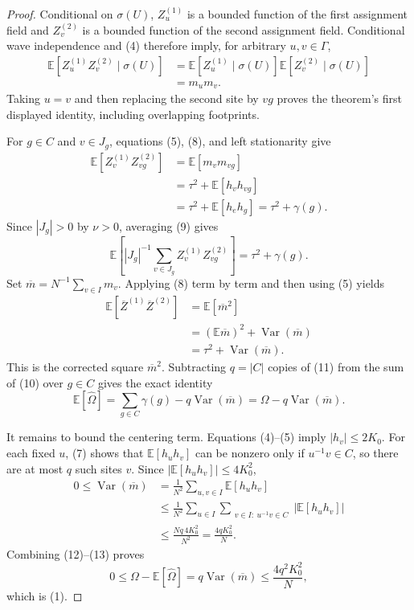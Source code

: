 \documentclass{article}
\begin{document}
\begin{proof}
Conditional on \(\sigma(U)\), \(Z_u^{(1)}\) is a bounded function of the first assignment field and \(Z_v^{(2)}\) is a bounded function of the second assignment field.  Conditional wave independence and (4) therefore imply, for arbitrary \(u,v\in\Gamma\),
\[
 \begin{aligned}
 \mathbb E[Z_u^{(1)}Z_v^{(2)}\mid\sigma(U)]
 &=\mathbb E[Z_u^{(1)}\mid\sigma(U)]
   \mathbb E[Z_v^{(2)}\mid\sigma(U)]\\
 &=m_um_v.
 \end{aligned} \tag{8}
\]
Taking \(u=v\) and then replacing the second site by \(vg\) proves the theorem's first displayed identity, including overlapping footprints.

For \(g\in C\) and \(v\in J_g\), equations (5), (8), and left stationarity give
\[
 \begin{aligned}
 \mathbb E[Z_v^{(1)}Z_{vg}^{(2)}]
 &=\mathbb E[m_vm_{vg}]\\
 &=\tau^2+\mathbb E[h_vh_{vg}]\\
 &=\tau^2+\mathbb E[h_eh_g]
 =\tau^2+\gamma(g).
 \end{aligned} \tag{9}
\]
Since \(|J_g|>0\) by \(\nu>0\), averaging (9) gives
\[
 \mathbb E\!\left[
 |J_g|^{-1}\sum_{v\in J_g}Z_v^{(1)}Z_{vg}^{(2)}
 \right]=\tau^2+\gamma(g). \tag{10}
\]
Set \(\overline m=N^{-1}\sum_{v\in I}m_v\).  Applying (8) term by term and then using (5) yields
\[
 \begin{aligned}
 \mathbb E[\overline Z^{(1)}\overline Z^{(2)}]
 &=\mathbb E[\overline m^2]\\
 &=(\mathbb E\overline m)^2+\operatorname{Var}(\overline m)\\
 &=\tau^2+\operatorname{Var}(\overline m).
 \end{aligned} \tag{11}
\]
This is the corrected square \(\overline m^2\).  Subtracting \(q=|C|\) copies of (11) from the sum of (10) over \(g\in C\) gives the exact identity
\[
 \mathbb E[\widehat\Omega]
 =\sum_{g\in C}\gamma(g)-q\operatorname{Var}(\overline m)
 =\Omega-q\operatorname{Var}(\overline m). \tag{12}
\]

It remains to bound the centering term.  Equations (4)--(5) imply \(|h_v|\le2K_0\).  For each fixed \(u\), (7) shows that \(\mathbb E[h_uh_v]\) can be nonzero only if \(u^{-1}v\in C\), so there are at most \(q\) such sites \(v\).  Since \(|\mathbb E[h_uh_v]|\le4K_0^2\),
\[
 \begin{aligned}
 0\le\operatorname{Var}(\overline m)
 &=\frac1{N^2}\sum_{u,v\in I}\mathbb E[h_uh_v]\\
 &\le\frac1{N^2}\sum_{u\in I}
       \sum_{\substack{v\in I:\ u^{-1}v\in C}}
       |\mathbb E[h_uh_v]|\\
 &\le\frac{Nq\,4K_0^2}{N^2}
 =\frac{4qK_0^2}{N}. 
 \end{aligned} \tag{13}
\]
Combining (12)--(13) proves
\[
 0\le\Omega-\mathbb E[\widehat\Omega]
 =q\operatorname{Var}(\overline m)
 \le\frac{4q^2K_0^2}{N},
\]
which is (1).


\end{proof}
\end{document}
